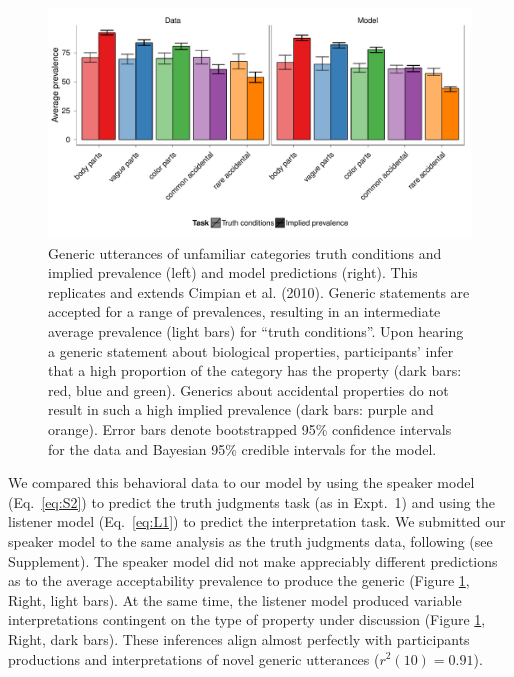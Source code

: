 \documentclass[10pt,letterpaper]{article}
\begin{document}
\begin{figure}
\centering
    \includegraphics[width=\columnwidth]{asym-data-model-2phi-2so-50kx3.pdf}
    \caption{Generic utterances of unfamiliar categories truth conditions and implied prevalence (left) and model predictions (right). 
    This replicates and extends Cimpian et al. (2010). 
    Generic statements are accepted for a range of prevalences, resulting in an intermediate average prevalence (light bars) for ``truth conditions''. 
    Upon hearing a generic statement about biological properties, participants' infer that a high proportion of the category has the property (dark bars: red, blue and green). 
    Generics about accidental properties do not result in such a high implied prevalence (dark bars: purple and orange).  
    Error bars denote bootstrapped 95\% confidence intervals for the data and Bayesian 95\% credible intervals for the model.}
  \label{fig:exp2b}
\end{figure}


We compared this behavioral data to our model by using the speaker model (Eq.~\ref{eq:S2}) to predict the truth judgments task (as in Expt.~1) and using the listener model (Eq.~\ref{eq:L1}) to predict the interpretation task. 
We submitted our speaker model to the same analysis as the truth judgments data, following  (see Supplement). 
The speaker model did not make appreciably different predictions as to the average acceptability prevalence to produce the generic (Figure \ref{fig:exp2b}, Right, light bars). 
At the same time, the listener model produced variable interpretations contingent on the type of property under discussion (Figure \ref{fig:exp2b}, Right, dark bars). These inferences align almost perfectly with participants productions and interpretations of novel generic utterances ($r^2(10) = 0.91$). 
\end{document}
